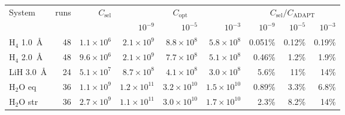 \begin{tabular}{@{}lrrrrrrrr@{}}
\toprule
System & runs & $C_{\mathrm{sel}}$ & \multicolumn{3}{c}{$C_{\mathrm{opt}}$} & \multicolumn{3}{c}{$C_{\mathrm{sel}}/C_{\mathrm{ADAPT}}$} \\
\cmidrule(lr){4-6}\cmidrule(lr){7-9}
 & & & $10^{-9}$ & $10^{-5}$ & $10^{-3}$ & $10^{-9}$ & $10^{-5}$ & $10^{-3}$ \\
\midrule
H$_4$ 1.0~\AA & 48 & $1.1\times10^{6}$ & $2.1\times10^{9}$ & $8.8\times10^{8}$ & $5.8\times10^{8}$ & 0.051\% & 0.12\% & 0.19\% \\
H$_4$ 2.0~\AA & 48 & $9.6\times10^{6}$ & $2.1\times10^{9}$ & $7.7\times10^{8}$ & $5.1\times10^{8}$ & 0.46\% & 1.2\% & 1.9\% \\
LiH 3.0~\AA & 24 & $5.1\times10^{7}$ & $8.7\times10^{8}$ & $4.1\times10^{8}$ & $3.0\times10^{8}$ & 5.6\% & 11\% & 14\% \\
H$_2$O eq & 36 & $1.1\times10^{9}$ & $1.2\times10^{11}$ & $3.2\times10^{10}$ & $1.5\times10^{10}$ & 0.89\% & 3.3\% & 6.8\% \\
H$_2$O str & 36 & $2.7\times10^{9}$ & $1.1\times10^{11}$ & $3.0\times10^{10}$ & $1.7\times10^{10}$ & 2.3\% & 8.2\% & 14\% \\
\bottomrule
\end{tabular}
